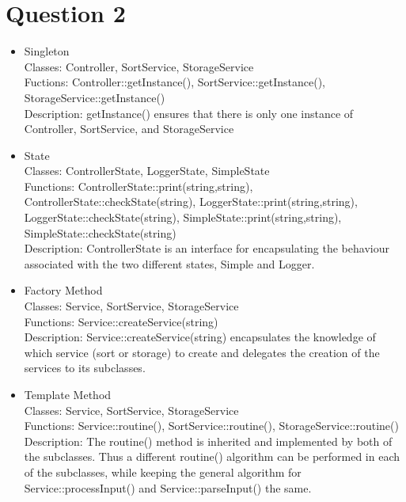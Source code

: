 \documentclass{article}[12pt]
\begin{document}
\section*{Question 2}
\begin{itemize}
  \item Singleton \\
    Classes: Controller, SortService, StorageService \\
    Fuctions: Controller::getInstance(), SortService::getInstance(), StorageService::getInstance() \\
    Description: getInstance() ensures that there is only one instance of Controller, SortService, and StorageService \\

  \item State \\
    Classes: ControllerState, LoggerState, SimpleState \\
    Functions: ControllerState::print(string,string), ControllerState::checkState(string), LoggerState::print(string,string), LoggerState::checkState(string),
    SimpleState::print(string,string), SimpleState::checkState(string) \\
    Description: ControllerState is an interface for encapsulating the behaviour associated with the two different states, Simple and Logger. \\
    
  \item Factory Method \\
    Classes: Service, SortService, StorageService \\
    Functions: Service::createService(string) \\
    Description: Service::createService(string) encapsulates the knowledge of which service (sort or storage) to create and delegates
    the creation of the services to its subclasses.
    
  \item Template Method \\
    Classes: Service, SortService, StorageService \\
    Functions: Service::routine(), SortService::routine(), StorageService::routine() \\
    Description: The routine() method is inherited and implemented by both of the subclasses. Thus a different routine() algorithm
    can be performed in each of the subclasses, while keeping the general algorithm for Service::processInput() and Service::parseInput() the same.


\end{itemize}
\end{document}

